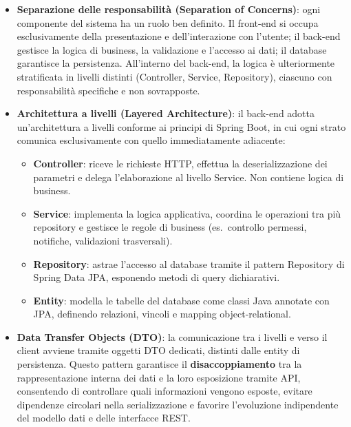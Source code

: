 \begin{itemize}[leftmargin=1.1em]
\item \textbf{Separazione delle responsabilità (Separation of Concerns)}: ogni componente del sistema ha un ruolo ben definito. Il front-end si occupa esclusivamente della presentazione e dell'interazione con l'utente; il back-end gestisce la logica di business, la validazione e l'accesso ai dati; il database garantisce la persistenza. All'interno del back-end, la logica è ulteriormente stratificata in livelli distinti (Controller, Service, Repository), ciascuno con responsabilità specifiche e non sovrapposte.

\item \textbf{Architettura a livelli (Layered Architecture)}: il back-end adotta un'architettura a livelli conforme ai principi di Spring Boot, in cui ogni strato comunica esclusivamente con quello immediatamente adiacente:
  \begin{itemize}
  \item \textbf{Controller}: riceve le richieste HTTP, effettua la deserializzazione dei parametri e delega l'elaborazione al livello Service. Non contiene logica di business.
  \item \textbf{Service}: implementa la logica applicativa, coordina le operazioni tra più repository e gestisce le regole di business (es.\ controllo permessi, notifiche, validazioni trasversali).
  \item \textbf{Repository}: astrae l'accesso al database tramite il pattern Repository di Spring Data JPA, esponendo metodi di query dichiarativi.
  \item \textbf{Entity}: modella le tabelle del database come classi Java annotate con JPA, definendo relazioni, vincoli e mapping object-relational.
  \end{itemize}

\item \textbf{Data Transfer Objects (DTO)}: la comunicazione tra i livelli e verso il client avviene tramite oggetti DTO dedicati, distinti dalle entity di persistenza. Questo pattern garantisce il \textbf{disaccoppiamento} tra la rappresentazione interna dei dati e la loro esposizione tramite API, consentendo di controllare quali informazioni vengono esposte, evitare dipendenze circolari nella serializzazione e favorire l'evoluzione indipendente del modello dati e delle interfacce REST.


\end{itemize}
